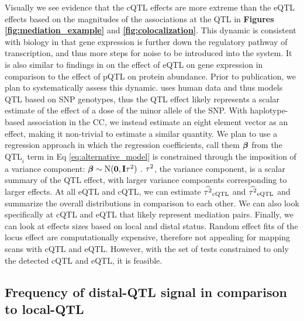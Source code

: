 Visually we see evidence that the cQTL effects are more extreme than the eQTL effects based on the magnitudes of the associations at the QTL in \textbf{Figures \ref{fig:mediation_example}} and \textbf{\ref{fig:colocalization}}. This dynamic is consistent with biology in that gene expression is further down the regulatory pathway of transcription, and thus more steps for noise to be introduced into the system. It is also similar to findings in \cite{Battle2015} on the effect of eQTL on gene expression in comparison to the effect of pQTL on protein abundance. Prior to publication, we plan to systematically assess this dynamic. \cite{Battle2015} uses human data and thus models QTL based on SNP genotypes, thus the QTL effect likely represents a scalar estimate of the effect of a dose of the minor allele of the SNP. With haplotype-based association in the CC, we instead estimate an eight element vector as an effect, making it non-trivial to estimate a similar quantity. We plan to use a regression approach in which the regression coefficients, call them $\boldsymbol{\beta}$ from the $\text{QTL}_{i}$ term in Eq \ref{eq:alternative_model} is constrained through the imposition of a variance component: $\boldsymbol{\beta} \sim \text{N}(\mathbf{0}, \mathbf{I} \tau^{2})$ \citep{Wei2016}. $\tau^{2}$, the variance component, is a scalar summary of the QTL effect, with larger variance components corresponding to larger effects.  At all eQTL and cQTL, we can estimate $\widehat{\tau^{2}}_{\text{cQTL}}$ and $\widehat{\tau^{2}}_{\text{eQTL}}$ and summarize the overall distributions in comparison to each other. We can also look specifically at cQTL and eQTL that likely represent mediation pairs. Finally, we can look at effects sizes based on local and distal status. Random effect fits of the locus effect are computationally expensive, therefore not appealing for mapping scans with cQTL and eQTL. However, with the set of tests constrained to only the detected cQTL and eQTL, it is feasible.

\subsection{Frequency of distal-QTL signal in comparison to local-QTL}

